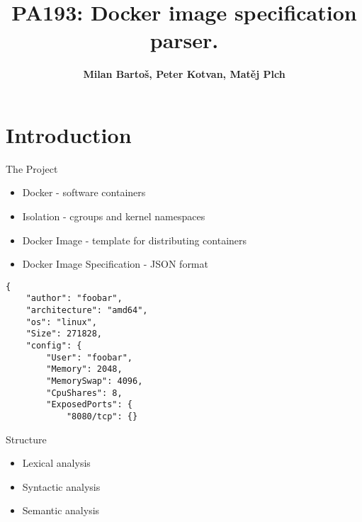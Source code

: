 \documentclass{beamer}
\title[Docker Img Spec Parser]{PA193: Docker image specification parser.} %
\author{\textbf{Milan Bartoš, Peter Kotvan, Matěj Plch}}
\institute[FI MUNI] %
{
FI MUNI \\ %
\medskip
}
\begin{document}
\begin{frame}
\titlepage %
\end{frame}


\section{Introduction}

\begin{frame}[fragile]{The Project}

\begin{itemize}
    \item Docker - software containers
    \pause \item Isolation - cgroups and kernel namespaces
    \pause \item Docker Image - template for distributing containers
    \pause \item Docker Image Specification - JSON format
\end{itemize}

\pause \begin{verbatim}
{
    "author": "foobar",
    "architecture": "amd64",
    "os": "linux",
    "Size": 271828,
    "config": {
        "User": "foobar",
        "Memory": 2048,
        "MemorySwap": 4096,
        "CpuShares": 8,
        "ExposedPorts": {  
            "8080/tcp": {}
\end{verbatim}
\end{frame}

\begin{frame}{Structure}

\begin{itemize}
    \item Lexical analysis
    \item Syntactic analysis
    \item Semantic analysis
\end{itemize}
\end{frame}
\end{document}
